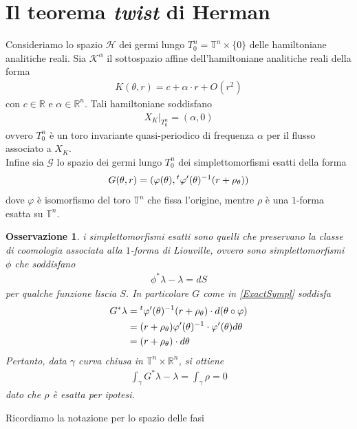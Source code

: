 \documentclass[twoside, 11pt]{amsbook}
\newcommand{\0}{{(0)}}
\newcommand{\3}{{(3)}}
\theoremstyle{colonplain}
\theoremstyle{colondefinition}
\theoremstyle{colonremark}
\newtheorem{rmk}[thm]{Osservazione}
\numberwithin{equation}{chapter}
\begin{document}
\section{Il teorema \textit{twist} di Herman}
Consideriamo lo spazio $\mathcal{H}$ dei germi lungo $T^n_0 = \mathbb{T}^n \times \{0\}$ delle hamiltoniane analitiche reali. Sia $\mathcal{K}^\alpha$ il sottospazio affine dell'hamiltoniane analitiche reali della forma
\begin{align}
    K(\theta, r) = c + \alpha \cdot r + O(r^2) 
\end{align}
con $c \in \mathbb{R}$ e $\alpha \in \mathbb{R}^n$. Tali hamiltoniane soddisfano
\begin{align}
    X_K|_{T^n_0} = (\alpha, 0) 
\end{align}
ovvero $T^n_0$ è un toro invariante quasi-periodico di frequenza $\alpha$ per il flusso associato a $X_K$. \\
Infine sia $\mathcal{G}$ lo spazio dei germi lungo $T^n_0$ dei simplettomorfismi esatti della forma
\begin{align}\label{ExactSympl}
    G(\theta, r) = (\varphi(\theta), \null^t\varphi'(\theta)^{-1}(r + \rho_\theta))
\end{align}
dove $\varphi$ è isomorfismo del toro $\mathbb{T}^n$ che fissa l'origine, mentre $\rho$ è una $1$-forma esatta su $\mathbb{T}^n$.
\begin{rmk}
i simplettomorfismi esatti sono quelli che preservano la classe di coomologia associata alla $1$-forma di Liouville, ovvero sono simplettomorfismi $\phi$ che soddisfano
\begin{align}
    \phi^*\lambda - \lambda = dS
\end{align}
per qualche funzione liscia $S$. In particolare $G$ come in \eqref{ExactSympl} soddisfa
\begin{align}
    G^*\lambda &= \null^t\varphi'(\theta)^{-1}(r + \rho_\theta) \cdot d(\theta \circ \varphi) \notag \\
    &= (r + \rho_\theta)\varphi'(\theta)^{-1} \cdot \varphi'(\theta)d\theta \\
    &= (r + \rho_\theta) \cdot d\theta
\end{align}
Pertanto, data $\gamma$ curva chiusa in $\mathbb{T}^n \times \mathbb{R}^n$, si ottiene
\begin{align}
    \int_\gamma G^*\lambda - \lambda = \int_\gamma \rho = 0
\end{align}
dato che $\rho$ è esatta per ipotesi.
\end{rmk}
Ricordiamo la notazione per lo spazio delle fasi
\end{document}

